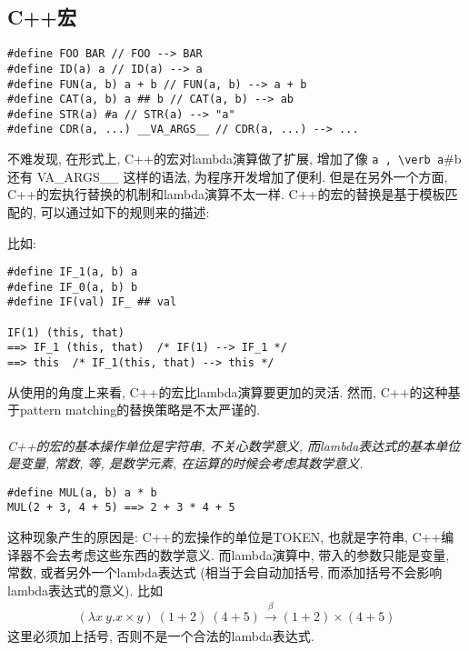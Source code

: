 \documentclass{article}
\begin{document}
\subsection{C++宏}
\begin{tcolorbox}
\begin{verbatim}
#define FOO BAR // FOO --> BAR
#define ID(a) a // ID(a) --> a
#define FUN(a, b) a + b // FUN(a, b) --> a + b
#define CAT(a, b) a ## b // CAT(a, b) --> ab
#define STR(a) #a // STR(a) --> "a"
#define CDR(a, ...) __VA_ARGS__ // CDR(a, ...) --> ...
\end{verbatim}
\end{tcolorbox}
不难发现, 在形式上, C++的宏对lambda演算做了扩展, 增加了像 \verb #a , \verb a##b 还有 \verb __VA_ARGS__ 这样的语法, 为程序开发增加了便利.
但是在另外一个方面, C++的宏执行替换的机制和lambda演算不太一样.
C++的宏的替换是基于模板匹配的, 可以通过如下的规则来的描述:
\begin{tcolorbox}
\end{tcolorbox}
比如:
\begin{tcolorbox}
\begin{verbatim}
#define IF_1(a, b) a
#define IF_0(a, b) b
#define IF(val) IF_ ## val

IF(1) (this, that)
==> IF_1 (this, that)  /* IF(1) --> IF_1 */
==> this  /* IF_1(this, that) --> this */

\end{verbatim}
\end{tcolorbox}
从使用的角度上来看, C++的宏比lambda演算要更加的灵活.
然而, C++的这种基于pattern matching的替换策略是不太严谨的.
\paragraph{} \emph{C++的宏的基本操作单位是字符串, 不关心数学意义, 而lambda表达式的基本单位是变量, 常数, 等, 是数学元素, 在运算的时候会考虑其数学意义.}
\begin{verbatim}
#define MUL(a, b) a * b
MUL(2 + 3, 4 + 5) ==> 2 + 3 * 4 + 5
\end{verbatim}
这种现象产生的原因是: C++的宏操作的单位是TOKEN, 也就是字符串, C++编译器不会去考虑这些东西的数学意义.
而lambda演算中, 带入的参数只能是变量, 常数, 或者另外一个lambda表达式 (相当于会自动加括号, 而添加括号不会影响lambda表达式的意义).
比如
\begin{align*}
  (\lambda x\ y . x \times y)\ (1 + 2)\ (4 + 5) \xrightarrow{\beta} (1 + 2) \times (4 + 5)
\end{align*}
这里必须加上括号, 否则不是一个合法的lambda表达式.
\end{document}
